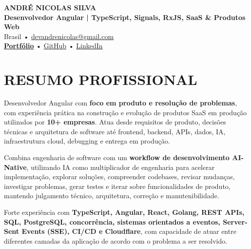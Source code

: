 \documentclass[10pt,a4paper]{article}
\begin{document}

\begin{center}

    {\LARGE \textbf{ANDRÉ NICOLAS SILVA}} \\[-2pt]

    {\normalsize \textbf{Desenvolvedor Angular | TypeScript, Signals, RxJS, SaaS \& Produtos Web}} \\[1pt]

    \footnotesize
    Brasil \quad • \quad
    \href{mailto:devandrenicolas@gmail.com}{devandrenicolas@gmail.com} \\[-1pt]

    \textbf{\href{https://portfolio-andrenicolas.vercel.app}{Portfólio}}
    \quad • \quad
    \href{https://github.com/devAndreNicolas}{GitHub}
    \quad • \quad
    \href{https://www.linkedin.com/in/devandrenicolas}{LinkedIn}

\end{center}

\vspace{-3pt}


\section*{RESUMO PROFISSIONAL}

\footnotesize

Desenvolvedor Angular com \textbf{foco em produto e resolução de
problemas}, com experiência prática na construção e evolução de
produtos SaaS em produção utilizados por \textbf{10+ empresas}.
Atua desde requisitos de produto, decisões técnicas e arquitetura
de software até frontend, backend, APIs, dados, IA, infraestrutura
cloud, debugging e entrega em produção.

Combina engenharia de software com um \textbf{workflow de
desenvolvimento AI-Native}, utilizando IA como multiplicador de
engenharia para acelerar implementação, explorar soluções,
compreender codebases, revisar mudanças, investigar problemas,
gerar testes e iterar sobre funcionalidades de produto, mantendo
julgamento técnico, arquitetura, correção e manutenibilidade.

Forte experiência com \textbf{TypeScript, Angular, React, Golang,
REST APIs, SQL, PostgreSQL, concorrência, sistemas orientados a
eventos, Server-Sent Events (SSE), CI/CD e Cloudflare}, com
capacidade de atuar entre diferentes camadas da aplicação de acordo
com o problema a ser resolvido.
\end{document}
